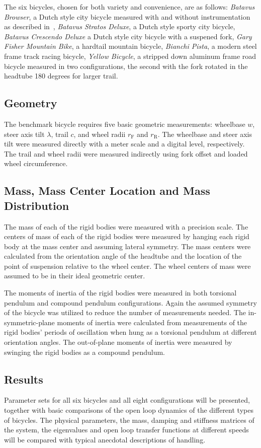 \documentclass{bmd2010a}
\begin{document}
The six bicycles, chosen for both variety and convenience, are as follows:
\emph{Batavus Browser}, a Dutch style city bicycle measured with and without
instrumentation as described in~\cite{Kooijman2009a}, \emph{Batavus Stratos
Deluxe}, a Dutch style sporty city bicycle, \emph{Batavus Crescendo Deluxe} a
Dutch style city bicycle with a suspened fork, \emph{Gary Fisher Mountain
Bike}, a hardtail mountain bicycle, \emph{Bianchi Pista}, a modern steel frame
track racing bicycle, \emph{Yellow Bicycle}, a stripped down aluminum frame
road bicycle measured in two configurations, the second with the fork rotated
in the headtube 180 degrees for larger trail.
\subsection*{Geometry}
The benchmark bicycle requires five basic geometric measurements: wheelbase
$w$, steer axis tilt $\lambda$, trail $c$, and wheel radii $r_\mathrm{F}$
and $r_\mathrm{R}$. The wheelbase and steer axis tilt were measured directly
with a meter scale and a digital level, respectively. The trail and wheel radii were
measured indirectly using fork offset and loaded wheel circumference.
\subsection*{Mass, Mass Center Location and Mass Distribution}
The mass of each of the rigid bodies were measured with a precision scale.
The centers of mass of each of the rigid bodies were measured by hanging each
rigid body at the mass center and assuming lateral symmetry. The mass centers
were calculated from the orientation angle of the headtube and the location of
the point of suspension relative to the wheel center.
The wheel centers of mass were assumed to be in their ideal
geometric center.

The moments of inertia of the rigid bodies were measured in both torsional
pendulum and compound pendulum configurations. Again the assumed symmetry of the
bicycle was utilized to reduce the number of measurements needed. The
in-symmetric-plane moments of inertia were calculated from measurements of the
rigid bodies' periods of oscillation when hung as a torsional pendulum at
different orientation angles. The out-of-plane moments of inertia were
measured by swinging the rigid bodies as a compound pendulum.
\subsection*{Results}
Parameter sets for all six bicycles and all eight
configurations  will be
presented, together with basic comparisons of the open loop dynamics of the
different types of bicycles. The physical parameters, the mass, damping and stiffness
matrices of the system, the eigenvalues and open loop transfer functions at
different speeds will be compared with typical anecdotal
descriptions of handling.



\end{document}
